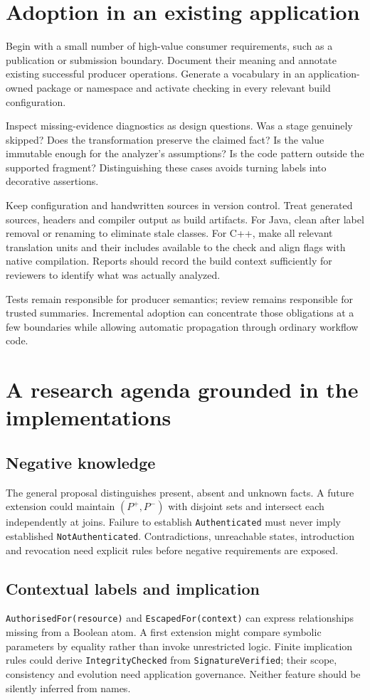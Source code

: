 \documentclass[11pt]{article}
\begin{document}
\section{Adoption in an existing application}
Begin with a small number of high-value consumer requirements, such as a
publication or submission boundary. Document their meaning and annotate
existing successful producer operations. Generate a vocabulary in an
application-owned package or namespace and activate checking in every
relevant build configuration.

Inspect missing-evidence diagnostics as design questions. Was a stage genuinely
skipped? Does the transformation preserve the claimed fact? Is the value
immutable enough for the analyzer's assumptions? Is the code pattern outside
the supported fragment? Distinguishing these cases avoids turning labels into
decorative assertions.

Keep configuration and handwritten sources in version control. Treat generated
sources, headers and compiler output as build artifacts. For Java, clean after
label removal or renaming to eliminate stale classes. For C++, make all relevant
translation units and their includes available to the check and align flags
with native compilation. Reports should record the build context sufficiently
for reviewers to identify what was actually analyzed.

Tests remain responsible for producer semantics; review remains responsible
for trusted summaries. Incremental adoption can concentrate those obligations
at a few boundaries while allowing automatic propagation through ordinary
workflow code.

\section{A research agenda grounded in the implementations}
\subsection{Negative knowledge}
The general proposal distinguishes present, absent and unknown facts.
A future extension could maintain $(P^+,P^-)$ with disjoint sets and intersect
each independently at joins. Failure to establish \texttt{Authenticated}
must never imply established \texttt{NotAuthenticated}. Contradictions,
unreachable states, introduction and revocation need explicit rules before
negative requirements are exposed.

\subsection{Contextual labels and implication}
\texttt{AuthorisedFor(resource)} and \texttt{EscapedFor(context)} can express
relationships missing from a Boolean atom. A first extension might compare
symbolic parameters by equality rather than invoke unrestricted logic.
Finite implication rules could derive \texttt{IntegrityChecked} from
\texttt{SignatureVerified}; their scope, consistency and evolution need
application governance. Neither feature should be silently inferred from names.
\end{document}
